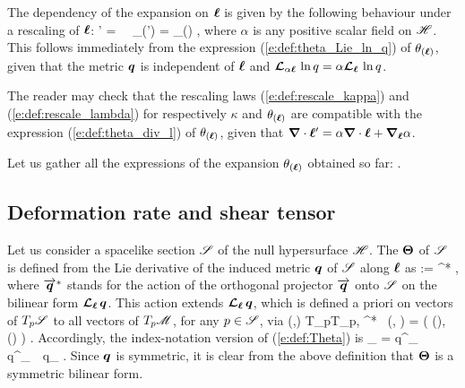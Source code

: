 {The dependency of the expansion on $\bm{\ell}$ is given by the following
behaviour under a rescaling of $\bm{\ell}$:
\be \label{e:def:rescale_lambda}
   \wl' = \alpha \wl \ \Longrightarrow \ \theta_{(\wl')} = \alpha \theta_{(\wl)} ,
\ee
where $\alpha$ is any positive scalar field on $\mathscr{H}$. This follows immediately
from the expression (\ref{e:def:theta_Lie_ln_q}) of $\theta_{(\bm{\ell})}$, given
that the metric $\bm{q}$ is independent of $\bm{\ell}$ and
$\bm{\mathcal{L}}_{\alpha\bm{\ell}}\,\ln q = \alpha \bm{\mathcal{L}}_{\bm{\bm{\ell}}}\,\ln q$.
\begin{remark}
The reader may check that the rescaling laws (\ref{e:def:rescale_kappa})
and (\ref{e:def:rescale_lambda}) for respectively $\kappa$ and $\theta_{(\bm{\ell})}$
are compatible with the expression (\ref{e:def:theta_div_l}) of $\theta_{(\bm{\ell})}$,
given that $\bm{\nabla}\cdot \bm{\ell}' = \alpha\bm{\nabla}\cdot\bm{\ell} + \bm{\nabla}_{\bm{\ell}} \alpha$.
\end{remark}

Let us gather all the expressions of the expansion $\theta_{(\bm{\ell})}$ obtained
so far:
\be
     .
\ee

\subsection{Deformation rate and shear tensor}

Let us consider a spacelike section $\mathscr{S}$ of the null hypersurface $\mathscr{H}$.
The  $\bm{\Theta}$ of $\mathscr{S}$ is defined from the Lie
derivative of the induced metric $\bm{q}$ of $\mathscr{S}$ along $\bm{\ell}$ as
\be \label{e:def:Theta}
    \w{\Theta} :=  ^* \Lie{\el}  ,
\ee
where $\overrightarrow{\bm{q}}^*$ stands for the action of the orthogonal projector $\overrightarrow{\bm{q}}$
onto $\mathscr{S}$ on the bilinear form $\bm{\mathcal{L}}_{\bm{\ell}}\, \bm{q}$.
This action extends $\bm{\mathcal{L}}_{\bm{\ell}}\, \bm{q}$, which is defined a priori on
vectors of $T_p\mathscr{S}$ to all vectors of $T_p\mathscr{M}$, for any $p\in\mathscr{S}$, via
\be
    \forall (,) \in T_p\M \times T_p\M, \quad
         ^* \Lie{\el} \,  (, ) =
         \Lie{\el}  \left( (), () \right) .
\ee
Accordingly, the index-notation version of (\ref{e:def:Theta}) is
\be \label{e:def:Theta_index}
    \Theta_{\alpha\beta} =  q^\mu_{\ \, \alpha} q^\nu_{\ \, \beta}
            \Liec{\el} q_{\mu\nu} .
\ee
Since $\bm{q}$ is symmetric, it is clear from the above definition that
$\bm{\Theta}$ is a symmetric bilinear form.

}
